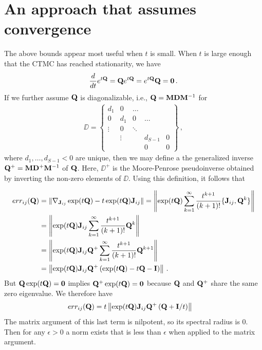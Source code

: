 \documentclass[12pt]{article} %
\begin{document}
\section{An approach that assumes convergence}
The above bounds appear most useful when $t$ is small.
 When $t$ is large enough that the CTMC has reached stationarity, we have 
 \begin{align*}
 	\frac{d}{dt}e^{t\mathbf{Q}} =  \mathbf{Q} e^{t\mathbf{Q}}=e^{t\mathbf{Q}} \mathbf{Q}  = \boldsymbol{0} \, .
 \end{align*}
 If we further assume $\mathbf{Q}$ is diagonalizable, i.e., $\mathbf{Q}=\mathbf{M} \mathbf{D} \mathbf{M}^{-1}$ for 
 \begin{align*}
 	\DD = \begin{Bmatrix}
 		d_1& 0 &\dots & & \\
 		0  & d_1 &0  & \dots& \\
 		\vdots &0 & \ddots & \\
 		 & \vdots& & d_{S-1} &0 \\
 		 &&&0&0
 	\end{Bmatrix} \, ,
 \end{align*}
 where $d_1,\dots,d_{S-1}<0$ are unique, then we may define a the generalized inverse $\mathbf{Q}^+=\mathbf{M} \mathbf{D}^{+} \mathbf{M}^{-1}$ of $\mathbf{Q}$. Here, $\DD^+$ is the Moore-Penrose pseudoinverse obtained by inverting the non-zero elements of $\DD$.  Using this definition, it follows that

		\begin{align*}
			err_{ij}(\mathbf{Q}) &=	\Vert\nabla_{\mathbf{J}_{ij}} \exp(t\mathbf{Q}) - t \exp(t\mathbf{Q})\mathbf{J}_{ij} \Vert = \left\Vert \exp(t\mathbf{Q})  \sum_{k=1}^\infty \frac{t^{k+1}}{(k+1)!} \{\mathbf{J}_{ij},\mathbf{Q}^k\} \right\Vert \\
		&=\left\Vert \exp(t\mathbf{Q}) \mathbf{J}_{ij}  \sum_{k=1}^\infty \frac{t^{k+1}}{(k+1)!} \mathbf{Q}^k \right\Vert \\
		&= \left\Vert \exp(t\mathbf{Q}) \mathbf{J}_{ij} \mathbf{Q}^+ \sum_{k=1}^\infty \frac{t^{k+1}}{(k+1)!} \mathbf{Q}^{k+1} \right\Vert \\
		&= \left\Vert \exp(t\mathbf{Q}) \mathbf{J}_{ij} \mathbf{Q}^+ \left( \exp(t\mathbf{Q})-t\mathbf{Q}-\mathbf{I} \right) \right\Vert  \, .
	\end{align*}
But $\mathbf{Q}\exp(t\mathbf{Q})= \boldsymbol{0}$ implies $\mathbf{Q}^+\exp(t\mathbf{Q})= \boldsymbol{0}$ because $\mathbf{Q}$ and $\mathbf{Q}^+$ share the same zero eigenvalue. We therefore have
\begin{align*}
err_{ij}(\mathbf{Q}) &=t \left\Vert \exp(t\mathbf{Q}) \mathbf{J}_{ij} \mathbf{Q}^+ \left( \mathbf{Q}+\mathbf{I}/t \right) \right\Vert 
\end{align*}
The matrix argument of this last term is nilpotent, so its spectral radius is 0.  Then for any $\epsilon>0$ a norm exists that is less than $\epsilon$ when applied to the matrix argument.
\end{document}
